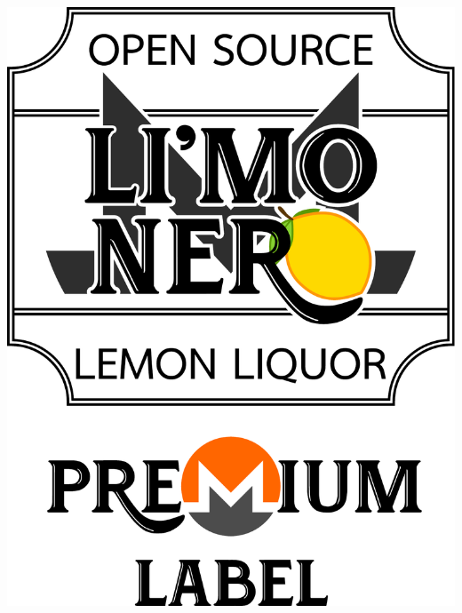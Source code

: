 \documentclass[12pt,a4paper]{article}
\begin{document}
\begin{center}
\includegraphics[width=1\textwidth]{img/prm-label.pdf}
\end{center}
\end{document}
